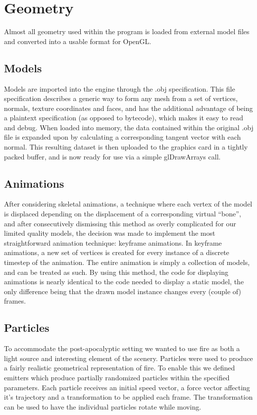 \section{Geometry}
Almost all geometry used within the program is loaded from external model files and converted into a usable format for OpenGL.

\subsection{Models}
Models are imported into the engine through the .obj specification. This file specification describes a generic way to form any mesh from a set of vertices, normals, texture coordinates and faces, and has the additional advantage of being a plaintext specification (as opposed to bytecode), which makes it easy to read and debug. When loaded into memory, the data contained within the original .obj file is expanded upon by calculating a corresponding tangent vector with each normal. This resulting dataset is then uploaded to the graphics card in a tightly packed buffer, and is now ready for use via a simple glDrawArrays call.

\subsection{Animations}
After considering skeletal animations, a technique where each vertex of the model is displaced depending on the displacement of a corresponding virtual ``bone'', and after consecutively dismissing this method as overly complicated for our limited quality models, the decision was made to implement the most straightforward animation technique: keyframe animations. In keyframe animations, a new set of vertices is created for every instance of a discrete timestep of the animation. The entire animation is simply a collection of models, and can be treated as such. By using this method, the code for displaying animations is nearly identical to the code needed to display a static model, the only difference being that the drawn model instance changes every (couple of) frames.

\subsection{Particles}
To accommodate the post-apocalyptic setting we wanted to use fire as both a light source and interesting element of the scenery. Particles were used to produce a fairly realistic geometrical representation of fire. To enable this we defined emitters which produce partially randomized particles within the specified parameters. Each particle receives an initial speed vector, a force vector affecting it's trajectory and a transformation to be applied each frame. The transformation can be used to have the individual particles rotate while moving. 

